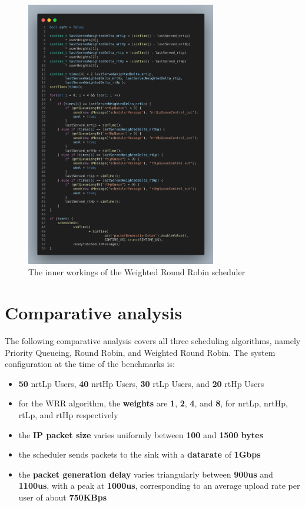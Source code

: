 \documentclass[12pt]{article}
\begin{document}
        \begin{figure}[htbp!]
            \centering
            \includegraphics[width=0.74\textwidth]{images/wrr_code.png}
            \caption{The inner workings of the Weighted Round Robin scheduler}
        \end{figure}

    \section{Comparative analysis}
    The following comparative analysis covers all three scheduling algorithms, namely Priority Queueing, Round Robin, and Weighted Round Robin. The system configuration at the time of the benchmarks is:
    \begin{itemize}
        \item{\textbf{50} nrtLp Users, \textbf{40} nrtHp Users, \textbf{30} rtLp Users, and \textbf{20} rtHp Users}
    \item{for the WRR algorithm, the \textbf{weights} are \textbf{1}, \textbf{2}, \textbf{4}, and \textbf{8}, for nrtLp, nrtHp, rtLp, and rtHp respectively}
        \item{the \textbf{IP packet size} varies uniformly between \textbf{100} and \textbf{1500 bytes}}
        \item{the scheduler sends packets to the sink with a \textbf{datarate} of \textbf{1Gbps}}
        \item{the \textbf{packet generation delay} varies triangularly between \textbf{900us} and \textbf{1100us}, with a peak at \textbf{1000us}, corresponding to an average upload rate per user of about \textbf{750KBps}}
    \end{itemize}
\end{document}
